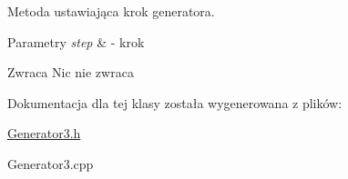 Metoda ustawiająca krok generatora. 


\begin{DoxyParams}{Parametry}
{\em step} & -\/ krok \\
\hline
\end{DoxyParams}
\begin{DoxyReturn}{Zwraca}
Nic nie zwraca 
\end{DoxyReturn}


Dokumentacja dla tej klasy została wygenerowana z plików\+:\begin{DoxyCompactItemize}
\item 
\hyperlink{Generator3_8h}{Generator3.\+h}\item 
Generator3.\+cpp\end{DoxyCompactItemize}
